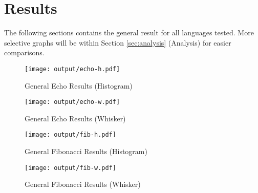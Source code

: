 \section{Results} \label{sec:results}
The following sections contains the general result for all languages tested. More selective graphs will be within Section \ref{sec:analysis} (Analysis) for easier comparisons.

\begin{figure}[H]
	\centering
		\texttt{[image: output/echo-h.pdf]}
	\caption{General Echo Results (Histogram)}
	\label{fig:echo-h}
\end{figure}

\begin{figure}[H]
	\centering
		\texttt{[image: output/echo-w.pdf]}
	\caption{General Echo Results (Whisker)}
	\label{fig:echo-w}
\end{figure}

\begin{figure}[H]
	\centering
		\texttt{[image: output/fib-h.pdf]}
	\caption{General Fibonacci Results (Histogram)}
	\label{fig:fib-h}
\end{figure}

\begin{figure}[H]
	\centering
		\texttt{[image: output/fib-w.pdf]}
	\caption{General Fibonacci Results (Whisker)}
	\label{fig:fib-w}
\end{figure}
